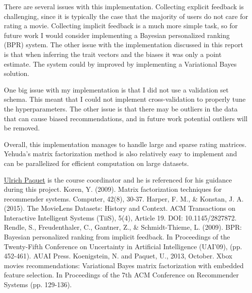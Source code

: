 \documentclass{article}
\begin{document}
There are several issues with this implementation. Collecting explicit feedback is challenging, since it is typically the case that the
majority of users do not care for rating a movie. Collecting implicit feedback is a much more simple task, so for future work I would
consider implementing a Bayesian personalized ranking~\cite{BPR} (BPR) system. The other issue with the implementation discussed in this report
is that when inferring the trait vectors and the biases it was only a point estimate. The system could by improved by implementing a Variational Bayes~\cite{VB}
solution.

One big issue with my implementation is that I did not use a validation set schema.
This meant that I could not implement cross-validation to properly tune the hyperparameters.
The other issue is that there may be outliers in the data that can cause biased recommendations, and in future work potential outliers will be removed.  

Overall, this implementation manages to handle large and sparse rating matrices. 
Yehuda's matrix factorization method is also relatively easy to implement and can be parallelized for efficient computation on large datasets.

\begin{thebibliography}{}
     \href{https://ulrichpaquet.com/}{Ulrich Paquet} is the course coordinator and he is referenced for his guidance during this project.
     Koren, Y. (2009). Matrix factorization techniques for recommender systems. Computer, 42(8), 30-37.
     Harper, F. M., \& Konstan, J. A. (2015). The MovieLens Datasets: History and Context. ACM Transactions on Interactive Intelligent Systems (TiiS), 5(4), Article 19. DOI: 10.1145/2827872.
     Rendle, S., Freudenthaler, C., Gantner, Z., \& Schmidt-Thieme, L. (2009). BPR: Bayesian personalized ranking from implicit feedback. In Proceedings of the Twenty-Fifth Conference on Uncertainty in Artificial Intelligence (UAI'09), (pp. 452-461). AUAI Press.
     Koenigstein, N. and Paquet, U., 2013, October. Xbox movies recommendations: Variational Bayes matrix factorization with embedded feature selection. In Proceedings of the 7th ACM Conference on Recommender Systems (pp. 129-136).
\end{thebibliography}
    
\end{document}
